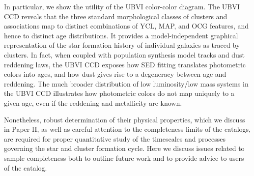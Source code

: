 \documentclass[linenumbers]{aastex63}
\begin{document}
{In particular, we show the utility of the UBVI color-color diagram.  The UBVI CCD reveals that the three standard morphological classes of clusters and associations map to distinct combinations of YCL, MAP, and OCG features, and hence to distinct age distributions.  It provides a model-independent graphical representation of the star formation history of individual galaxies as traced by clusters.  In fact, when coupled with population synthesis model tracks and dust reddening laws, the UBVI CCD exposes how SED fitting translates photometric colors into ages, and how dust gives rise to a degeneracy between age and reddening.   The much broader distribution of low luminosity/low mass systems in the UBVI CCD illustrates how photometric colors do not map uniquely to a given age, even if the reddening and metallicity are known.


Nonetheless, robust determination of their physical properties, which we discuss in Paper II, as well as careful attention to the completeness limits of the catalogs, are required for proper quantitative study of the timescales and processes governing the star and cluster formation cycle.  Here we discuss issues related to sample completeness both to outline future work and to provide advice to users of the catalog.

}
\end{document}
